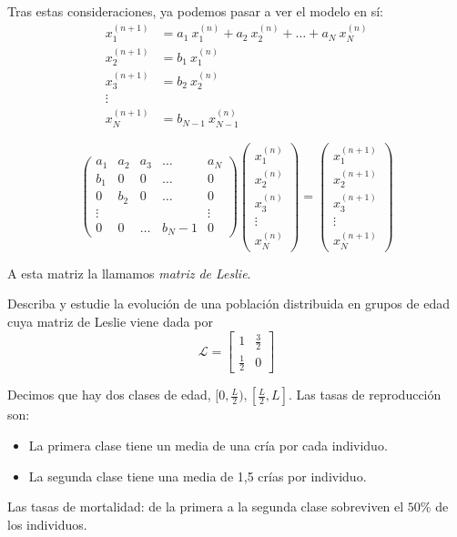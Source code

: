     Tras estas consideraciones, ya podemos pasar a ver el modelo en sí:
    \begin{align*}
        \label{}
        x_1^{(n+1)} &= a_1 \ x_1^{(n)} + a_2 \ x_2^{(n)} + \hdots + a_N \ x_N^{(n)}  \\
        x_2^{(n+1)} &= b_1 \ x_1^{(n)} \\
        x_3^{(n+1)} &= b_2 \ x_2^{(n)} \\
        \vdots \\
        x_N^{(n+1)} &= b_{N-1} \ x_{N-1}^{(n)}
    \end{align*}

    $$
    \begin{pmatrix}
        a_1 & a_2 & a_3 & \hdots & a_N \\
        b_1 & 0 & 0 & \hdots & 0 \\
        0 & b_2 & 0 & \hdots & 0 \\
        \vdots & & & & \vdots \\
        0 & 0 & \hdots & b_N-1 & 0
    \end{pmatrix} \begin{pmatrix}
        x_1^{(n)} \\
        x_2^{(n)} \\
        x_3^{(n)} \\
        \vdots \\
        x_N^{(n)}
    \end{pmatrix} = \begin{pmatrix}
        x_1^{(n+1)} \\
        x_2^{(n+1)} \\
        x_3^{(n+1)} \\
        \vdots \\
        x_N^{(n+1)}
    \end{pmatrix}$$

A esta matriz la llamamos \textit{matriz de Leslie}.

    \begin{ejemplo}
        Describa y estudie la evolución de una población distribuida en grupos de edad cuya matriz de Leslie viene dada por $$\mathcal L = \begin{bmatrix}
            1 & \frac{3}{2} \\
            \frac{1}{2} & 0
        \end{bmatrix}$$

        Decimos que hay dos clases de edad, $[0, \frac{L}{2}), [ \frac{L}{2}, L ]$. Las tasas de reproducción son: \begin{itemize}
            \item La primera clase tiene un media de una cría por cada individuo.
            \item La segunda clase tiene una media de 1,5 crías por individuo.
        \end{itemize}
        Las tasas de mortalidad: de la primera a la segunda clase sobreviven el $50\%$ de los individuos.

    \end{ejemplo}

